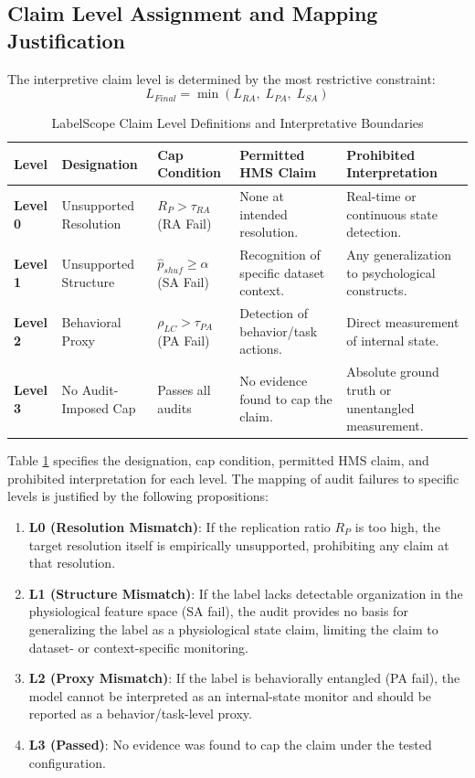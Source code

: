 \documentclass[journal]{IEEEtran}
\begin{document}
\subsection{Claim Level Assignment and Mapping Justification}
The interpretive claim level is determined by the most restrictive constraint:
\begin{equation}
    L_{Final} = \min(L_{RA},\; L_{PA},\; L_{SA})
\end{equation}

\begin{table}[t!]
\caption{LabelScope Claim Level Definitions and Interpretative Boundaries}
\label{tab:claim_levels}
\centering
\begin{tabular}{@{}p{1.2cm}p{3cm}p{3.5cm}p{4cm}p{4cm}@{}}
\toprule
\textbf{Level} & \textbf{Designation} & \textbf{Cap Condition} & \textbf{Permitted HMS Claim} & \textbf{Prohibited Interpretation} \\
\midrule
\textbf{Level 0} & Unsupported Resolution & $R_P > \tau_{RA}$ (RA Fail) & None at intended resolution. & Real-time or continuous state detection. \\
\textbf{Level 1} & Unsupported Structure & $\hat{p}_{shuf} \ge \alpha$ (SA Fail) & Recognition of specific dataset context. & Any generalization to psychological constructs. \\
\textbf{Level 2} & Behavioral Proxy & $\rho_{LC} > \tau_{PA}$ (PA Fail) & Detection of behavior/task actions. & Direct measurement of internal state. \\
\textbf{Level 3} & No Audit-Imposed Cap & Passes all audits & No evidence found to cap the claim. & Absolute ground truth or unentangled measurement. \\
\bottomrule
\end{tabular}
\end{table}

Table \ref{tab:claim_levels} specifies the designation, cap condition, permitted HMS claim, and prohibited interpretation for each level. The mapping of audit failures to specific levels is justified by the following propositions:
\begin{enumerate}
    \item \textbf{L0 (Resolution Mismatch)}: If the replication ratio $R_P$ is too high, the target resolution itself is empirically unsupported, prohibiting any claim at that resolution.
    \item \textbf{L1 (Structure Mismatch)}: If the label lacks detectable organization in the physiological feature space (SA fail), the audit provides no basis for generalizing the label as a physiological state claim, limiting the claim to dataset- or context-specific monitoring.
    \item \textbf{L2 (Proxy Mismatch)}: If the label is behaviorally entangled (PA fail), the model cannot be interpreted as an internal-state monitor and should be reported as a behavior/task-level proxy.
    \item \textbf{L3 (Passed)}: No evidence was found to cap the claim under the tested configuration.
\end{enumerate}
\end{document}
